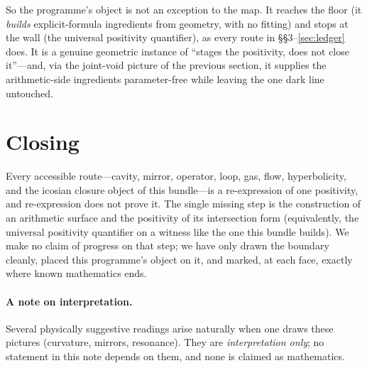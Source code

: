 \documentclass[11pt]{article}
\begin{document}
\noindent So the programme's object is not an exception to the map. It reaches the floor
(it \emph{builds} explicit-formula ingredients from geometry, with no fitting) and stops
at the wall (the universal positivity quantifier), as every route in
\S\S3--\ref{sec:ledger} does. It is a genuine geometric instance of ``stages the
positivity, does not close it''---and, via the joint-void picture of the previous
section, it supplies the arithmetic-side ingredients parameter-free while leaving the
one dark line untouched.

\section{Closing}
Every accessible route---cavity, mirror, operator, loop, gas, flow, hyperbolicity, and
the icosian closure object of this bundle---is a re-expression of one positivity, and
re-expression does not prove it. The single missing step is the construction of an
arithmetic surface and the positivity of its intersection form (equivalently, the
universal positivity quantifier on a witness like the one this bundle builds). We make
no claim of progress on that step; we have only drawn the boundary cleanly, placed this
programme's object on it, and marked, at each face, exactly where known mathematics ends.

\paragraph{A note on interpretation.} Several physically suggestive readings arise
naturally when one draws these pictures (curvature, mirrors, resonance). They are
\emph{interpretation only}; no statement in this note depends on them, and none is
claimed as mathematics.
\end{document}
